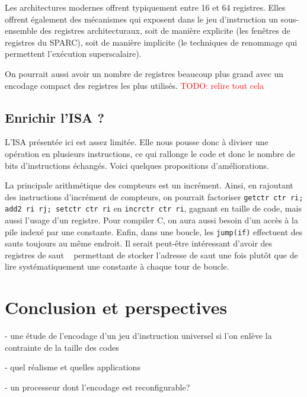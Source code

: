 \documentclass[architecture]{compas2018}
\newcommand{\todo}[1]{\textcolor{red}{TODO: #1}}
\begin{document}
Les architectures modernes offrent typiquement entre 16 et 64 registres.
Elles offrent également des mécanismes qui exposent dans le jeu d'instruction un sous-ensemble des registres architecturaux, soit de manière explicite (les fenêtres de registres du SPARC), soit de manière implicite (le techniques de renommage qui permettent l'exécution superscalaire).

On pourrait aussi avoir un nombre de registres beaucoup plus grand avec un encodage compact des registres les plus utilisés.
\todo{relire tout cela}

\subsection{Enrichir l'ISA ?}

L'ISA présentée ici est assez limitée. Elle nous pousse donc à diviser une opération en plusieurs instructions, ce qui rallonge le code et donc le nombre de bits d'instructions échangés. Voici quelques propositions d'améliorations.\par
La principale arithmétique des compteurs est un incrément. Ainsi, en rajoutant des instructions d'incrément de compteurs, on pourrait factoriser \texttt{getctr ctr ri; add2 ri rj; setctr ctr ri} en \texttt{incrctr ctr ri}, gagnant en taille de code, mais aussi l'usage d'un registre. Pour compiler C, on aura aussi besoin d'un accès à la pile indexé par une constante. Enfin, dans une boucle, les \texttt{jump(if)} effectuent des sauts toujours au même endroit. Il serait peut-être intéressant d'avoir des registres \og{} de saut \ \fg{} permettant de stocker l'adresse de saut une fois plutôt que de lire systématiquement une constante à chaque tour de boucle.  

\section{Conclusion et perspectives}

- une étude de l'encodage d'un jeu d'instruction universel si l'on enlève la contrainte de la taille des codes

- quel réalisme et quelles applications

- un processeur dont l'encodage est reconfigurable? 

\end{document}
